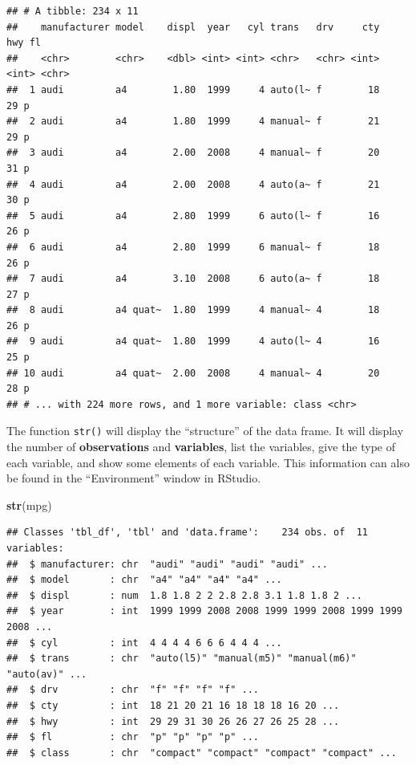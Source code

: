 \documentclass[]{book}
\newenvironment{Shaded}{\begin{snugshade}}{\end{snugshade}}
\newcommand{\KeywordTok}[1]{\textcolor[rgb]{0.13,0.29,0.53}{\textbf{#1}}}
\newcommand{\NormalTok}[1]{#1}
\theoremstyle{definition}
\theoremstyle{definition}
\theoremstyle{definition}
\theoremstyle{remark}
\begin{document}
\begin{verbatim}
## # A tibble: 234 x 11
##    manufacturer model    displ  year   cyl trans   drv     cty   hwy fl   
##    <chr>        <chr>    <dbl> <int> <int> <chr>   <chr> <int> <int> <chr>
##  1 audi         a4        1.80  1999     4 auto(l~ f        18    29 p    
##  2 audi         a4        1.80  1999     4 manual~ f        21    29 p    
##  3 audi         a4        2.00  2008     4 manual~ f        20    31 p    
##  4 audi         a4        2.00  2008     4 auto(a~ f        21    30 p    
##  5 audi         a4        2.80  1999     6 auto(l~ f        16    26 p    
##  6 audi         a4        2.80  1999     6 manual~ f        18    26 p    
##  7 audi         a4        3.10  2008     6 auto(a~ f        18    27 p    
##  8 audi         a4 quat~  1.80  1999     4 manual~ 4        18    26 p    
##  9 audi         a4 quat~  1.80  1999     4 auto(l~ 4        16    25 p    
## 10 audi         a4 quat~  2.00  2008     4 manual~ 4        20    28 p    
## # ... with 224 more rows, and 1 more variable: class <chr>
\end{verbatim}

The function \texttt{str()} will display the ``structure'' of the data
frame. It will display the number of \textbf{observations} and
\textbf{variables}, list the variables, give the type of each variable,
and show some elements of each variable. This information can also be
found in the ``Environment'' window in RStudio.

\begin{Shaded}
\begin{Highlighting}[]
\KeywordTok{str}\NormalTok{(mpg)}
\end{Highlighting}
\end{Shaded}

\begin{verbatim}
## Classes 'tbl_df', 'tbl' and 'data.frame':    234 obs. of  11 variables:
##  $ manufacturer: chr  "audi" "audi" "audi" "audi" ...
##  $ model       : chr  "a4" "a4" "a4" "a4" ...
##  $ displ       : num  1.8 1.8 2 2 2.8 2.8 3.1 1.8 1.8 2 ...
##  $ year        : int  1999 1999 2008 2008 1999 1999 2008 1999 1999 2008 ...
##  $ cyl         : int  4 4 4 4 6 6 6 4 4 4 ...
##  $ trans       : chr  "auto(l5)" "manual(m5)" "manual(m6)" "auto(av)" ...
##  $ drv         : chr  "f" "f" "f" "f" ...
##  $ cty         : int  18 21 20 21 16 18 18 18 16 20 ...
##  $ hwy         : int  29 29 31 30 26 26 27 26 25 28 ...
##  $ fl          : chr  "p" "p" "p" "p" ...
##  $ class       : chr  "compact" "compact" "compact" "compact" ...
\end{verbatim}
\end{document}
